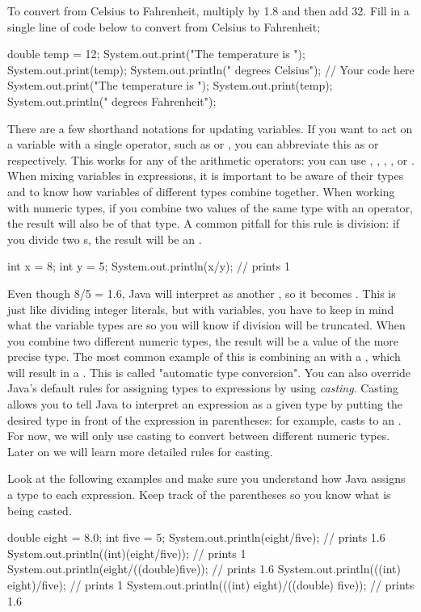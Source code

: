 \begin{example}	
  To convert from Celsius to Fahrenheit, multiply by 1.8 and then add 32. Fill in a single line of code below to convert  from Celsius to Fahrenheit;	
  \begin{code}	
    double temp = 12;	
    System.out.print("The temperature is ");	
    System.out.print(temp);	
    System.out.println(" degrees Celsius");	
    // Your code here	
    System.out.print("The temperature is ");	
    System.out.print(temp);	
    System.out.println(" degrees Fahrenheit");	
  \end{code}	
\end{example}	
There are a few shorthand notations for updating variables. If you want to act on a variable  with a single operator, such as  or , you can abbreviate this as  or  respectively. This works for any of the arithmetic operators: you can use \ic{+=}, \ic{-=}, \ic{*=}, \ic{/=}, or \ic{\%=}.	
When mixing variables in expressions, it is important to be aware of their types and to know how variables of different types combine together. When working with numeric types, if you combine two values of the same type with an operator, the result will also be of that type. A common pitfall for this rule is division: if you divide two s, the result will be an .	
\begin{code}	
  int x = 8;	
  int y = 5;	
  System.out.println(x/y); // prints 1	
\end{code}	
Even though 8/5 = 1.6, Java will interpret  as another , so it becomes . This is just like dividing integer literals, but with variables, you have to keep in mind what the variable types are so you will know if division will be truncated.	
When you combine two different numeric types, the result will be a value of the more precise type. The most common example of this is combining an  with a , which will result in a . This is called "automatic type conversion".
You can also override Java's default rules for assigning types to expressions by using \emph{casting}. Casting allows you to tell Java to interpret an expression as a given type by putting the desired type in front of the expression in parentheses: for example,  casts  to an . For now, we will only use casting to convert between different numeric types. Later on we will learn more detailed rules for casting.	
\begin{example}	
  Look at the following examples and make sure you understand how Java assigns a type to each expression. Keep track of the parentheses so you know what is being casted.	
  \begin{code}	
    double eight = 8.0;	
    int five = 5;	
    System.out.println(eight/five); // prints 1.6	
    System.out.println((int)(eight/five)); // prints 1	
    System.out.println(eight/((double)five)); // prints 1.6	
    System.out.println(((int) eight)/five); // prints 1	
    System.out.println(((int) eight)/((double) five)); // prints 1.6	
  \end{code}	
\end{example}	

